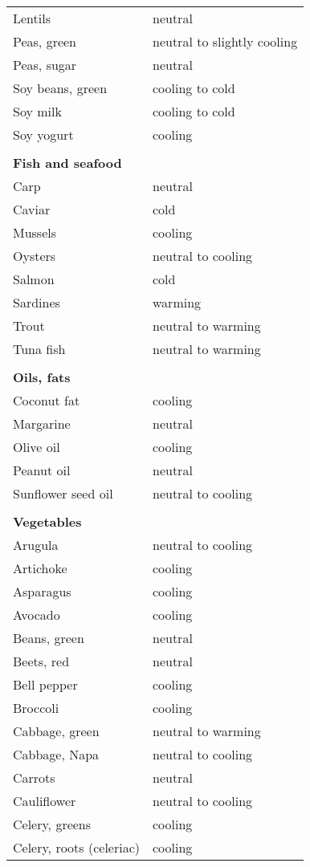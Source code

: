 \documentclass[../main.tex]{subfiles}
\begin{document}
\begin{longtable}{ll}
Lentils & neutral  \\
Peas, green & neutral to slightly cooling \\
Peas, sugar & neutral  \\
Soy beans, green & cooling to cold \\
Soy milk & cooling to cold \\
Soy yogurt & cooling   \\
 \\
\multicolumn{2}{l}{\textbf{Fish and seafood}} \\
Carp & neutral   \\
Caviar & cold \\
Mussels & cooling \\
Oysters & neutral to cooling \\
Salmon & cold \\
Sardines & warming \\
Trout & neutral to warming \\
Tuna fish & neutral to warming \\
 \\
\multicolumn{2}{l}{\textbf{Oils, fats}} \\
Coconut fat & cooling \\
Margarine & neutral \\
Olive oil & cooling \\
Peanut oil & neutral \\
Sunflower seed oil & neutral to cooling \\
 \\
\multicolumn{2}{l}{\textbf{Vegetables}} \\
Arugula & neutral to cooling \\
Artichoke & cooling \\
Asparagus & cooling \\
Avocado & cooling \\
Beans, green & neutral \\
Beets, red & neutral \\
Bell pepper & cooling \\
Broccoli & cooling \\
Cabbage, green & neutral to warming \\
Cabbage, Napa & neutral to cooling \\
Carrots & neutral \\
Cauliflower & neutral to cooling \\
Celery, greens & cooling \\
Celery, roots (celeriac) & cooling \\

\end{longtable}
\end{document}
